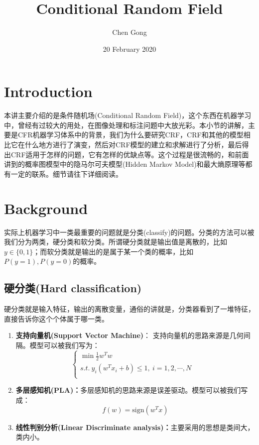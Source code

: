 \documentclass[a4paper]{article}
\title{Conditional Random Field}
\author{Chen Gong}
\date{20 February 2020}
\begin{document}
\maketitle
\tableofcontents
\newpage
\setcounter{page}{1} %
\clearpage
\section{Introduction}
本讲主要介绍的是条件随机场(Conditional Random Field)，这个东西在机器学习中，曾经有过较大的用处，在图像处理和标注问题中大放光彩。本小节的讲解，主要是CFR机器学习体系中的背景，我们为什么要研究CRF，CRF和其他的模型相比它在什么地方进行了演变，然后对CRF模型的建立和求解进行了分析，最后得出CRF适用于怎样的问题，它有怎样的优缺点等。这个过程是很流畅的，和前面讲到的概率图模型中的隐马尔可夫模型(Hidden Markov Model)和最大熵原理等都有一定的联系。细节请往下详细阅读。

\section{Background}
实际上机器学习中一类最重要的问题就是分类(classify)的问题。分类的方法可以被我们分为两类，硬分类和软分类。所谓硬分类就是输出值是离散的，比如$y\in \{0,1\}$；而软分类就是输出的是属于某一个类的概率，比如$P(y=1),P(y=0)$的概率。
\subsection{硬分类(Hard classification)}
硬分类就是输入特征，输出的离散变量，通俗的讲就是，分类器看到了一堆特征，直接告诉你这个个体属于哪一类。
\begin{enumerate}
    \item \textbf{支持向量机(Support Vector Machine)}：
{\color{red}支持向量机的思路来源是几何间隔}。模型可以被我们写为：
\begin{equation}
    \left\{
    \begin{array}{ll}
      \min \frac{1}{2} w^Tw & \\
      s.t. \ y_i(w^Tx_i+b) \leq 1, \ i=1,2,\cdots,N & \\
    \end{array}
    \right.
\end{equation}

\item \textbf{多层感知机(PLA)：}{\color{red}多层感知机的思路来源是误差驱动}。模型可以被我们写成：
$$f(w) = \mathrm{sign}(w^Tx)$$

\item \textbf{线性判别分析(Linear Discriminate analysis)：}{\color{red}主要采用的思想是类间大，类内小。}
\end{enumerate}
\end{document}
